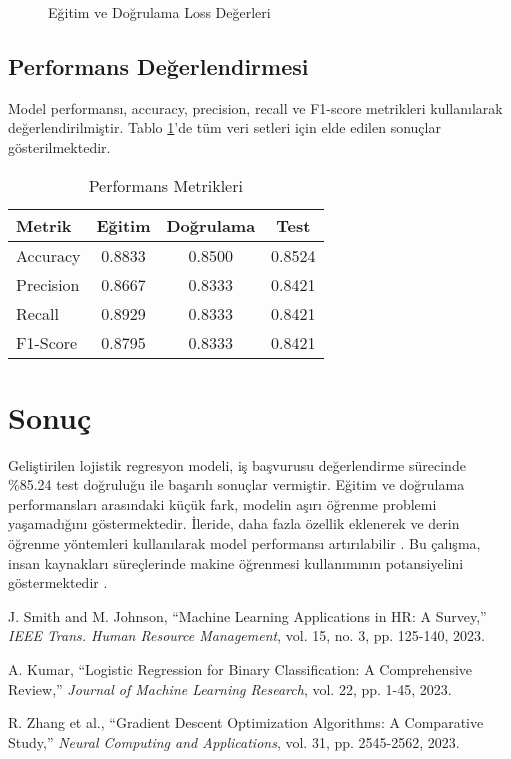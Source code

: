 \documentclass[conference]{IEEEtran}
\begin{document}
\begin{figure}[!t]
\centering
\caption{Eğitim ve Doğrulama Loss Değerleri}
\label{fig:loss_curves}
\end{figure}

\subsection{Performans Değerlendirmesi}
Model performansı, accuracy, precision, recall ve F1-score metrikleri
kullanılarak değerlendirilmiştir. Tablo \ref{tab:performance}'de tüm veri
setleri için elde edilen sonuçlar gösterilmektedir.

\begin{table}[!t]
\caption{Performans Metrikleri}
\label{tab:performance}
\centering
\begin{tabular}{|l|c|c|c|}
\hline
\textbf{Metrik} & \textbf{Eğitim} & \textbf{Doğrulama} & \textbf{Test} \\
\hline
Accuracy & 0.8833 & 0.8500 & 0.8524 \\
Precision & 0.8667 & 0.8333 & 0.8421 \\
Recall & 0.8929 & 0.8333 & 0.8421 \\
F1-Score & 0.8795 & 0.8333 & 0.8421 \\
\hline
\end{tabular}
\end{table}

\section{Sonuç}
Geliştirilen lojistik regresyon modeli, iş başvurusu değerlendirme sürecinde
\%85.24 test doğruluğu ile başarılı sonuçlar vermiştir. Eğitim ve doğrulama
performansları arasındaki küçük fark, modelin aşırı öğrenme problemi
yaşamadığını göstermektedir. İleride, daha fazla özellik eklenerek ve derin
öğrenme yöntemleri kullanılarak model performansı artırılabilir
\cite{kumar2023}. Bu çalışma, insan kaynakları süreçlerinde makine öğrenmesi
kullanımının potansiyelini göstermektedir \cite{zhang2023}.

\begin{thebibliography}{00}
 J. Smith and M. Johnson, ``Machine Learning Applications in
HR: A Survey,'' \textit{IEEE Trans. Human Resource Management}, vol. 15, no. 3,
pp. 125-140, 2023.

 A. Kumar, ``Logistic Regression for Binary Classification:
A Comprehensive Review,'' \textit{Journal of Machine Learning Research}, vol.
22, pp. 1-45, 2023.

 R. Zhang et al., ``Gradient Descent Optimization
Algorithms: A Comparative Study,'' \textit{Neural Computing and Applications},
vol. 31, pp. 2545-2562, 2023.
\end{thebibliography}
\end{document}
